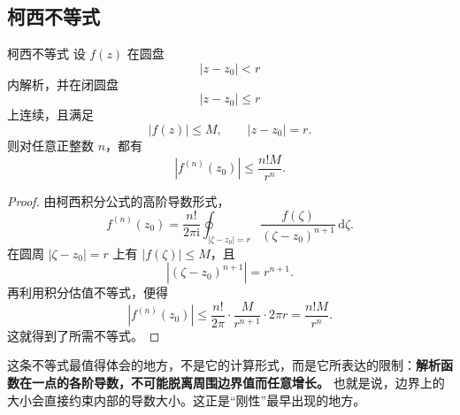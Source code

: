 \subsection{柯西不等式}

\begin{dingli}{柯西不等式}{}
设 $f(z)$ 在圆盘
\[
    |z-z_0|<r
\]
内解析，并在闭圆盘
\[
    |z-z_0|\le r
\]
上连续，且满足
\[
    |f(z)|\le M,\qquad |z-z_0|=r.
\]
则对任意正整数 $n$，都有
\[
    |f^{(n)}(z_0)|\le \frac{n!M}{r^n}.
\]
\end{dingli}

\begin{proof}
由柯西积分公式的高阶导数形式，
\[
    f^{(n)}(z_0)=\frac{n!}{2\pi\mathrm{i}}\oint_{|\zeta-z_0|=r}\frac{f(\zeta)}{(\zeta-z_0)^{n+1}}\,\mathrm{d}\zeta.
\]
在圆周 $|\zeta-z_0|=r$ 上有 $|f(\zeta)|\le M$，且
\[
    |(\zeta-z_0)^{n+1}|=r^{n+1}.
\]
再利用积分估值不等式，便得
\[
    |f^{(n)}(z_0)|
    \le \frac{n!}{2\pi}\cdot \frac{M}{r^{n+1}}\cdot 2\pi r
    = \frac{n!M}{r^n}.
\]
这就得到了所需不等式。
\end{proof}

\begin{tishi}[柯西不等式告诉了我们什么]
这条不等式最值得体会的地方，不是它的计算形式，而是它所表达的限制：\textbf{解析函数在一点的各阶导数，不可能脱离周围边界值而任意增长。} 也就是说，边界上的大小会直接约束内部的导数大小。这正是``刚性''最早出现的地方。
\end{tishi}

